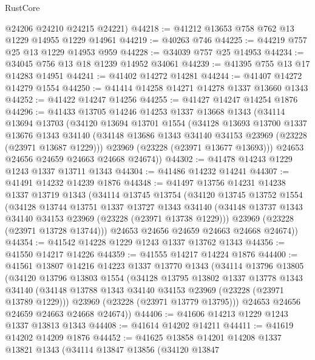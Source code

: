 \begin{lexlean}{RustCore}
\begin{coremodule}
      @24206
      @24210
      @24215
      @24221)
@44218 := @41212 @13653 @758 @762 @13 @1229 @14955 @1229 @14961
@44219 := @40263 @746
@44225 := @44219 @757 @25 @13 @1229 @14953 @959
@44228 := @34039 @757 @25 @14953
@44234 := @34045 @756 @13 @18 @1239 @14952 @34061
@44239 := @41395 @755 @13 @17 @14283 @14951
@44241 := @41402 @14272 @14281
@44244 := @41407 @14272 @14279 @1554
@44250 := @41414 @14258 @14271 @14278 @1337 @13660 @1343
@44252 := @41422 @14247 @14256
@44255 := @41427 @14247 @14254 @1876
@44296 := @41433
    @13705
    @14246
    @14253
    @1337
    @13668
    @1343
    (@34114
      @13694
      @13703
      (@34120
        @13694
        @13701
        @1554
        (@34128
          @13693
          @13700
          @1337
          @13676
          @1343
          @34140
          (@34148 @13686 @1343 @34140 @34153 @23969 (@23228 (@23971 @13687 @1229)))
          @23969
          (@23228 (@23971 @13677 @13693)))
        @24653
        @24656
        @24659
        @24663
        @24668
        @24674))
@44302 := @41478 @14243 @1229 @1243 @1337 @13711 @1343
@44304 := @41486 @14232 @14241
@44307 := @41491 @14232 @14239 @1876
@44348 := @41497
    @13756
    @14231
    @14238
    @1337
    @13719
    @1343
    (@34114
      @13745
      @13754
      (@34120
        @13745
        @13752
        @1554
        (@34128
          @13744
          @13751
          @1337
          @13727
          @1343
          @34140
          (@34148 @13737 @1343 @34140 @34153 @23969 (@23228 (@23971 @13738 @1229)))
          @23969
          (@23228 (@23971 @13728 @13744)))
        @24653
        @24656
        @24659
        @24663
        @24668
        @24674))
@44354 := @41542 @14228 @1229 @1243 @1337 @13762 @1343
@44356 := @41550 @14217 @14226
@44359 := @41555 @14217 @14224 @1876
@44400 := @41561
    @13807
    @14216
    @14223
    @1337
    @13770
    @1343
    (@34114
      @13796
      @13805
      (@34120
        @13796
        @13803
        @1554
        (@34128
          @13795
          @13802
          @1337
          @13778
          @1343
          @34140
          (@34148 @13788 @1343 @34140 @34153 @23969 (@23228 (@23971 @13789 @1229)))
          @23969
          (@23228 (@23971 @13779 @13795)))
        @24653
        @24656
        @24659
        @24663
        @24668
        @24674))
@44406 := @41606 @14213 @1229 @1243 @1337 @13813 @1343
@44408 := @41614 @14202 @14211
@44411 := @41619 @14202 @14209 @1876
@44452 := @41625
    @13858
    @14201
    @14208
    @1337
    @13821
    @1343
    (@34114
      @13847
      @13856
      (@34120
        @13847

\end{coremodule}
\end{lexlean}
